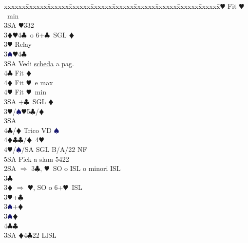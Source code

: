 \documentclass[a4paper,italian]{article}
\newcommand{\BC}{\textcolor{OliveGreen}{$\clubsuit$}}
\newcommand{\BD}{\textcolor{RedOrange}{$\vardiamondsuit$}}
\newcommand{\BH}{\textcolor{Red2}{$\varheartsuit${}}}
\newcommand{\BS}{\textcolor{MidnightBlue}{$\spadesuit${}}}
\newenvironment{bidtable}
{\begin{tabbing}

    xxxxxx\=xxxxxx\=xxxxxx\=xxxxxx\=xxxxxx\=xxxxxx\=xxxxxx\=xxxxxx\=xxxxxx\=xxxxxx\=\kill}
{\end{tabbing} }%
\begin{document}
\begin{multicols}{2}
\begin{bidtable}
                                            4\BH\> Fit \BH\ min\-\\
                                            3SA \BH 332\-\-\\
                                            3\BD {}\BH 4\BC\ o 6+\BC\ SGL \BD \+\\
                                            3\BH \> Relay\+\\
                                            3\BS {}\BH 4\BC\+\\
                                            3SA\> Vedi \hyperref[Riapertura3SA]{scheda} a pag. \pageref{Riapertura3SA}\\
                                            4\BC\> Fit \BD\\
                                            4\BD\> Fit \BH\ e max\\
                                            4\BH\> Fit \BH\ min\-\\
                                            3SA +\BC\ SGL \BD \-\-\\
                                            3\BH/\BS {}\BH 5\BC /\BD \+\\
                                            3SA\+\\
                                            4\BC/\BD \> Trico VD \BS \\
                                            4\BD\BC {}\BC /\BD\ 4\BH \\
                                            4\BH/\BS/SA\> \> SGL B/A/22 NF\\
                                            5SA \> Pick a slam 5422\-\-\-\-\\
                                            2SA \> $\Rightarrow$ 3\BC , \BH\ SO o ISL o minori ISL\+\\
                                            3\BC\+\\
                                            3\BD \> $\Rightarrow$ \BH , SO o 6+\BH\ ISL\\
                                            3\BH {}+\BC \+\\
                                            3\BS {}+\BD \-\\
                                            3\BS {}\BD \+\\
                                            4\BC {}\BC \-\\
                                            3SA \BD 4\BC 22 LISL\-\-\\

\end{bidtable}
\end{multicols}
\end{document}
